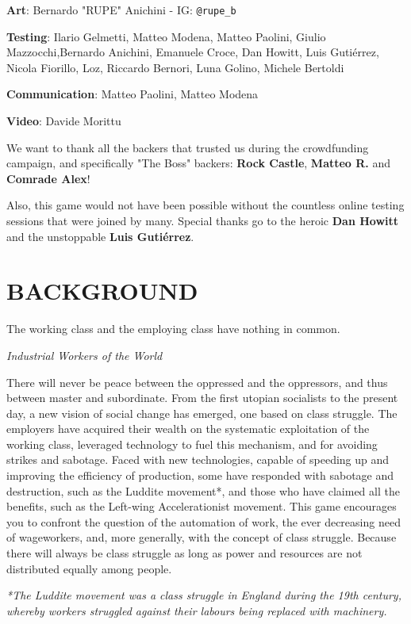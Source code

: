    \textbf{Art}: Bernardo "RUPE" Anichini - IG: \texttt{@rupe\_b}
    
    \textbf{Testing}: Ilario Gelmetti, Matteo Modena, Matteo Paolini, Giulio Mazzocchi,Bernardo Anichini,
    Emanuele Croce, Dan Howitt, Luis Gutiérrez, Nicola Fiorillo, Loz, Riccardo Bernori,
    Luna Golino, Michele Bertoldi
    
    \textbf{Communication}: Matteo Paolini, Matteo Modena
    
    \textbf{Video}: Davide Morittu
    
    We want to thank all the backers that trusted us during the crowdfunding campaign, and
    specifically "The Boss" backers: \textbf{Rock Castle}, \textbf{Matteo R.} and \textbf{Comrade Alex}!
    
    Also, this game would not have been possible without the countless online testing
    sessions that were joined by many. Special thanks go to the heroic \textbf{Dan Howitt} and the
    unstoppable \textbf{Luis Gutiérrez}.


\section{BACKGROUND}

    \epigraph{The working class and the employing class have nothing in common.}{\textit{Industrial Workers of the World}}
    
    There will never be peace between the oppressed and the oppressors, and thus between
    master and subordinate. From the first utopian socialists to the present day, a new vision
    of social change has emerged, one based on class struggle. The employers have acquired
    their wealth on the systematic exploitation of the working class, leveraged technology to
    fuel this mechanism, and for avoiding strikes and sabotage. Faced with new technologies,
    capable of speeding up and improving the efficiency of production, some have responded with
    sabotage and destruction, such as the Luddite movement*, and those who
    have claimed all the benefits, such as the Left-wing Accelerationist movement. This game
    encourages you to confront the question of the automation of work, the ever decreasing
    need of wageworkers, and, more generally, with the concept of class struggle. Because
    there will always be class struggle as long as power and resources are not distributed
    equally among people.
    
    \textsl{*The Luddite movement was a class struggle in England during the 19th century, whereby
    workers struggled against their labours being replaced with machinery.}


